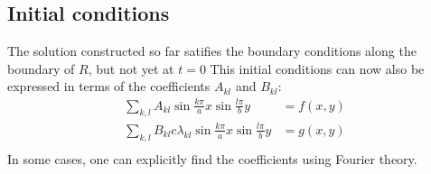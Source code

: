 \subsection{Initial conditions}
The solution constructed so far satifies the boundary conditions along
the boundary of $R$, but not yet at $t=0$
This initial conditions can now also be expressed in terms of the
coefficients $A_{kl}$ and $B_{kl}$:
\begin{align*}
\sum_{k,l}A_{kl}
\sin \frac{k\pi}{a}x\sin\frac{l\pi}{b}y&=f(x,y)\\
\sum_{k,l}B_{kl}c\lambda_{kl}
\sin \frac{k\pi}{a}x\sin\frac{l\pi}{b}y&=g(x,y)\\
\end{align*}
In some cases, one can explicitly find the coefficients using Fourier
theory.

